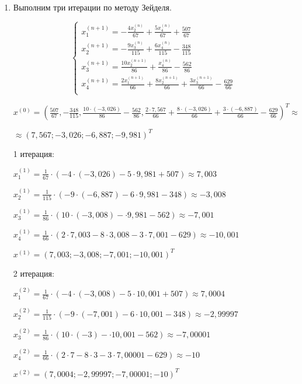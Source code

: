 \documentclass[a4paper,12pt]{article} %
\begin{document}
\begin{enumerate}
\item Выполним три итерации по методу Зейделя.

\begin{equation*}
\begin{cases}
    x_1^{(n+1)} = -\frac{4x_2^{(n)}}{67} + \frac{5x_4^{(n)}}{67} + \frac{507}{67} \\
    x_2^{(n+1)} = -\frac{9x_3^{(n)}}{115} + \frac{6x_4^{(n)}}{115} - \frac{348}{115} \\
    x_3^{(n+1)} = \frac{10x_2^{(n+1)}}{86} + \frac{x_4^{(n)}}{86} - \frac{562}{86} \\
    x_4^{(n+1)} = \frac{2x_1^{(n+1)}}{66} + \frac{8x_2^{(n+1)}}{66} + \frac{3x_3^{(n+1)}}{66} - \frac{629}{66} \\
\end{cases}
\end{equation*}

$x^{(0)} = (\frac{507}{67}, -\frac{348}{115}, \frac{10 \cdot (-3,026)}{86} -\frac{562}{86}, \frac{2 \cdot 7,567}{66} + \frac{8 \cdot (-3,026)}{66} + \frac{3 \cdot (-6,887)}{66} - \frac{629}{66})^T \approx $

$\approx (7,567; -3,026; -6,887; -9,981)^T$

1 итерация:

$x_1^{(1)} = \frac{1}{67} \cdot (-4 \cdot (-3,026) - 5 \cdot 9,981 + 507) \approx 7,003$

$x_2^{(1)} = \frac{1}{115} \cdot (-9 \cdot (-6,887) - 6 \cdot 9,981 - 348) \approx -3,008$

$x_3^{(1)} = \frac{1}{86} \cdot (10 \cdot (-3,008) - \cdot 9,981 - 562) \approx -7,001$

$x_4^{(1)} = \frac{1}{66} \cdot (2 \cdot 7,003 - 8 \cdot 3,008 - 3 \cdot 7,001 - 629) \approx -10,001$

$x^{(1)} = (7,003; -3,008; -7,001; -10,001)^T$

\newpage

2 итерация:

$x_1^{(2)} = \frac{1}{67} \cdot (-4 \cdot (-3,008) - 5 \cdot 10,001 + 507) \approx 7,0004$

$x_2^{(2)} = \frac{1}{115} \cdot (-9 \cdot (-7,001) - 6 \cdot 10,001 - 348) \approx -2,99997$

$x_3^{(2)} = \frac{1}{86} \cdot (10 \cdot (-3) - \cdot 10,001 - 562) \approx -7,00001$

$x_4^{(2)} = \frac{1}{66} \cdot (2 \cdot 7 - 8 \cdot 3 - 3 \cdot 7,00001 - 629) \approx -10$

$x^{(2)} = (7,0004; -2,99997; -7,00001; -10)^T$


\end{enumerate}
\end{document}
